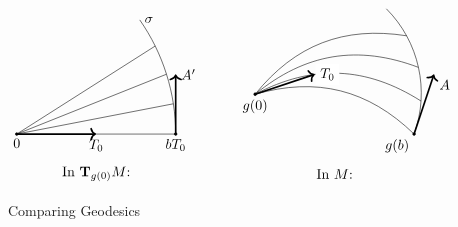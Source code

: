 \documentclass[../../main]{subfiles}
\begin{document}
\begin{figure}[h!]
\[
\begin{tikzpicture}
    \begin{scope}
    \filldraw (0,0) circle (1pt) node[anchor=north] {$0$};
    \draw[very thick, ->] (0,0)--(2,0) node[anchor=north] {$T_0$};
    \filldraw (2,0)--(4,0) circle (1pt) node[anchor=north] {$bT_0$};
    \draw[very thick, ->] (4,0)--(4,1.5) node[anchor=west] {$A'$};
    
    \draw (4,0) arc (0:35:5cm)
        coordinate[pos=0.25](P1)
        coordinate[pos=0.5](P2)
        coordinate[pos=0.75](P3)
        node[anchor=west] {$\sigma$};

    \foreach \i in {1,2,3}
    {
        \draw (0,0)--(P\i);
    }
    \end{scope}
    
    \begin{scope}[shift={(6,1)}]
    \filldraw (0,0) circle (1pt) node[anchor=north]{$g(0)$};
    \filldraw (4,-1) circle (1pt) node[anchor=north east]{$g(b)$};
    
    \draw (0,0) to[bend left] (4,-1);
        
    \draw (4,-1) arc (-20:45:3cm)
        coordinate[pos=0.25](P1)
        coordinate[pos=0.5](P2)
        coordinate[pos=0.75](P3);
        
    \foreach \i in {1,2,3}
    {
        \draw (0,0) to[bend left=30] (P\i);
    }
    
    \draw[very thick, ->]
        (0,0)--(1.5,0.5) node[anchor=west, fill=white] {$T_0$};
    \draw[very thick, ->]
        (4,-1)--(4.5,0.5) node[anchor=north west] {$A$};
    \end{scope}
    
    \draw (2,-1) node {In $\tangentspace{M}{g(0)}$:};
    \draw (8,-1) node {In $M$:};
\end{tikzpicture}
\]
\caption{Comparing Geodesics}
\label{fig:ch10fig3}
\end{figure}
\end{document}
